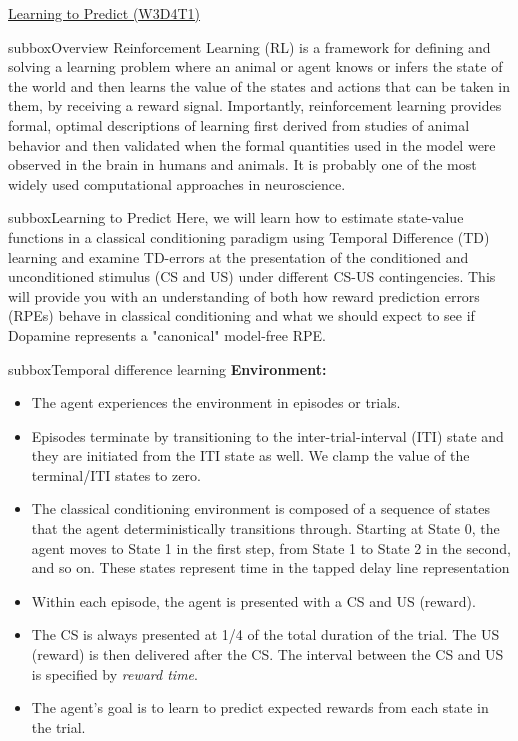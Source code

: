 \begin{textbox}{\href{https://compneuro.neuromatch.io/tutorials/W3D4_ReinforcementLearning/student/W3D4_Tutorial1.html}{Learning to Predict (W3D4T1)} }
\begin{subbox}{subbox}{Overview}
\scriptsize
Reinforcement Learning (RL) is a framework for defining and solving a learning problem where an animal or agent knows or infers the state of the world and then learns the value of the states and actions that can be taken in them, by receiving a reward signal. Importantly, reinforcement learning provides formal, optimal descriptions of learning first derived from studies of animal behavior and then validated when the formal quantities used in the model were observed in the brain in humans and animals. It is probably one of the most widely used computational approaches in neuroscience.


\end{subbox}
\begin{subbox}{subbox}{Learning to Predict}
\scriptsize
Here, we will learn how to estimate state-value functions in a classical conditioning paradigm using Temporal Difference (TD) learning and examine TD-errors at the presentation of the conditioned and unconditioned stimulus (CS and US) under different CS-US contingencies. This will provide you with an understanding of both how reward prediction errors (RPEs) behave in classical conditioning and what we should expect to see if Dopamine represents a "canonical" model-free RPE. 

\end{subbox}

\begin{subbox}{subbox}{Temporal difference learning}
\scriptsize
\textbf{Environment:}
\begin{itemize}

\item The agent experiences the environment in episodes or trials. 
\item Episodes terminate by transitioning to the inter-trial-interval (ITI) state and they are initiated from the ITI state as well. We clamp the value of the terminal/ITI states to zero. 
\item The classical conditioning environment is composed of a sequence of states that the agent deterministically transitions through. Starting at State 0, the agent moves to State 1 in the first step, from State 1 to State 2 in the second, and so on.  These states represent time in the tapped delay line representation
\item Within each episode, the agent is presented with a CS and US (reward). 
\item The CS is always presented at 1/4 of the total duration of the trial. The US (reward) is then delivered after the CS. The interval between the CS and US is specified by \textit{reward time}.
\item The agent's goal is to learn to predict expected rewards from each state in the trial. 
\end{itemize}

\end{subbox}


\end{textbox}
